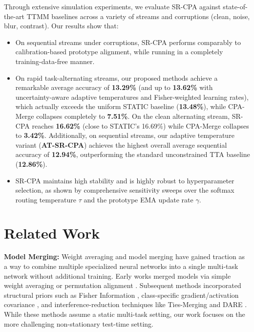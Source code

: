 \documentclass{article}
\theoremstyle{plain}
\theoremstyle{definition}
\theoremstyle{remark}
\begin{document}
Through extensive simulation experiments, we evaluate SR-CPA against state-of-the-art TTMM baselines across a variety of streams and corruptions (clean, noise, blur, contrast). Our results show that:
\begin{itemize}
    \item On sequential streams under corruptions, SR-CPA performs comparably to calibration-based prototype alignment, while running in a completely training-data-free manner.
    \item On rapid task-alternating streams, our proposed methods achieve a remarkable average accuracy of \textbf{13.29\%} (and up to \textbf{13.62\%} with uncertainty-aware adaptive temperatures and Fisher-weighted learning rates), which actually exceeds the uniform STATIC baseline (\textbf{13.48\%}), while CPA-Merge collapses completely to \textbf{7.51\%}. On the clean alternating stream, SR-CPA reaches \textbf{16.62\%} (close to STATIC's 16.69\%) while CPA-Merge collapses to \textbf{3.42\%}. Additionally, on sequential streams, our adaptive temperature variant (\textbf{AT-SR-CPA}) achieves the highest overall average sequential accuracy of \textbf{12.94\%}, outperforming the standard unconstrained TTA baseline (\textbf{12.86\%}).
    \item SR-CPA maintains high stability and is highly robust to hyperparameter selection, as shown by comprehensive sensitivity sweeps over the softmax routing temperature $\tau$ and the prototype EMA update rate $\gamma$.
\end{itemize}

\section{Related Work}
\label{sec:related}

\textbf{Model Merging:} Weight averaging and model merging have gained traction as a way to combine multiple specialized neural networks into a single multi-task network without additional training. Early works merged models via simple weight averaging \cite{wortsman2022model} or permutation alignment \cite{ainsworth2022git}. Subsequent methods incorporated structural priors such as Fisher Information \cite{matena2022merging}, class-specific gradient/activation covariance \cite{jin2022regmean, stoica2023zipit}, and interference-reduction techniques like Ties-Merging \cite{yadav2023resolving} and DARE \cite{yu2023language}. While these methods assume a static multi-task setting, our work focuses on the more challenging non-stationary test-time setting.
\end{document}
